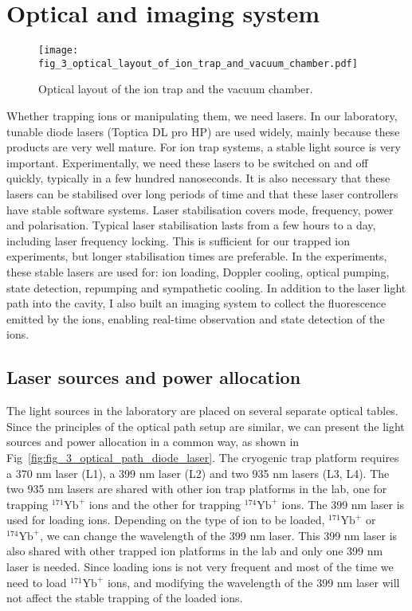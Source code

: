 \section{Optical and imaging system}

\begin{figure}
    \centering
    \texttt{[image: fig\_3\_optical\_layout\_of\_ion\_trap\_and\_vacuum\_chamber.pdf]}
    \caption{Optical layout of the ion trap and the vacuum chamber.}
\end{figure}

Whether trapping ions or manipulating them, we need lasers. In our laboratory, tunable diode lasers (Toptica DL pro HP) are used widely, mainly because these products are very well mature. For ion trap systems, a stable light source is very important. Experimentally, we need these lasers to be switched on and off quickly, typically in a few hundred nanoseconds. It is also necessary that these lasers can be stabilised over long periods of time and that these laser controllers have stable software systems. Laser stabilisation covers mode, frequency, power and polarisation. Typical laser stabilisation lasts from a few hours to a day, including laser frequency locking. This is sufficient for our trapped ion experiments, but longer stabilisation times are preferable. In the experiments, these stable lasers are used for: ion loading, Doppler cooling, optical pumping, state detection, repumping and sympathetic cooling. In addition to the laser light path into the cavity, I also built an imaging system to collect the fluorescence emitted by the ions, enabling real-time observation and state detection of the ions.

\subsection{Laser sources and power allocation}

The light sources in the laboratory are placed on several separate optical tables. Since the principles of the optical path setup are similar, we can present the light sources and power allocation in a common way, as shown in Fig~\ref{fig:fig_3_optical_path_diode_laser}. The cryogenic trap platform requires a 370 nm laser (L1), a 399 nm laser (L2) and two 935 nm lasers (L3, L4). The two 935 nm lasers are shared with other ion trap platforms in the lab, one for trapping ${ }^{171} \mathrm{Yb}^{+}$ ions and the other for trapping ${ }^{174} \mathrm{Yb}^{+}$ ions. The 399 nm laser is used for loading ions. Depending on the type of ion to be loaded, ${ }^{171} \mathrm{Yb}^{+}$ or ${ }^{174} \mathrm{Yb}^{+}$, we can change the wavelength of the 399 nm laser. This 399 nm laser is also shared with other trapped ion platforms in the lab and only one 399 nm laser is needed. Since loading ions is not very frequent and most of the time we need to load ${ }^{171} \mathrm{Yb}^{+}$ ions, and modifying the wavelength of the 399 nm laser will not affect the stable trapping of the loaded ions.

